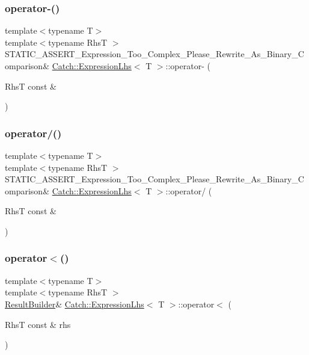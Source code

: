 \subsubsection{\texorpdfstring{operator-\/()}{operator-()}}
{\footnotesize\ttfamily template$<$typename T$>$ \\
template$<$typename RhsT $>$ \\
S\+T\+A\+T\+I\+C\+\_\+\+A\+S\+S\+E\+R\+T\+\_\+\+Expression\+\_\+\+Too\+\_\+\+Complex\+\_\+\+Please\+\_\+\+Rewrite\+\_\+\+As\+\_\+\+Binary\+\_\+\+Comparison\& \hyperlink{class_catch_1_1_expression_lhs}{Catch\+::\+Expression\+Lhs}$<$ T $>$\+::operator-\/ (\begin{DoxyParamCaption}\item[{RhsT const \&}]{ }\end{DoxyParamCaption})}

\hypertarget{class_catch_1_1_expression_lhs_a37d50565046ac9b1c9159a7c0cf88a1e}{}\label{class_catch_1_1_expression_lhs_a37d50565046ac9b1c9159a7c0cf88a1e} 
\subsubsection{\texorpdfstring{operator/()}{operator/()}}
{\footnotesize\ttfamily template$<$typename T$>$ \\
template$<$typename RhsT $>$ \\
S\+T\+A\+T\+I\+C\+\_\+\+A\+S\+S\+E\+R\+T\+\_\+\+Expression\+\_\+\+Too\+\_\+\+Complex\+\_\+\+Please\+\_\+\+Rewrite\+\_\+\+As\+\_\+\+Binary\+\_\+\+Comparison\& \hyperlink{class_catch_1_1_expression_lhs}{Catch\+::\+Expression\+Lhs}$<$ T $>$\+::operator/ (\begin{DoxyParamCaption}\item[{RhsT const \&}]{ }\end{DoxyParamCaption})}

\hypertarget{class_catch_1_1_expression_lhs_a48428d358ddc89729e2e3407f4024dac}{}\label{class_catch_1_1_expression_lhs_a48428d358ddc89729e2e3407f4024dac} 
\subsubsection{\texorpdfstring{operator$<$()}{operator<()}}
{\footnotesize\ttfamily template$<$typename T$>$ \\
template$<$typename RhsT $>$ \\
\hyperlink{class_catch_1_1_result_builder}{Result\+Builder}\& \hyperlink{class_catch_1_1_expression_lhs}{Catch\+::\+Expression\+Lhs}$<$ T $>$\+::operator$<$ (\begin{DoxyParamCaption}\item[{RhsT const \&}]{rhs }\end{DoxyParamCaption})\hspace{0.3cm}{\ttfamily [inline]}}



